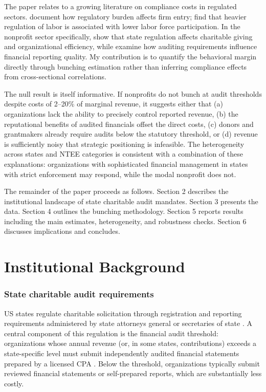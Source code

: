 \documentclass[12pt]{article}
\begin{document}
The paper relates to a growing literature on compliance costs in regulated sectors. \citet{Djankov2002} document how regulatory burden affects firm entry; \citet{Botero2004} find that heavier regulation of labor is associated with lower labor force participation. In the nonprofit sector specifically, \citet{Garven2018} show that state regulation affects charitable giving and organizational efficiency, while \citet{Krishnan2006} examine how auditing requirements influence financial reporting quality. My contribution is to quantify the behavioral margin directly through bunching estimation rather than inferring compliance effects from cross-sectional correlations.

The null result is itself informative. If nonprofits do not bunch at audit thresholds despite costs of 2--20\% of marginal revenue, it suggests either that (a) organizations lack the ability to precisely control reported revenue, (b) the reputational benefits of audited financials offset the direct costs, (c) donors and grantmakers already require audits below the statutory threshold, or (d) revenue is sufficiently noisy that strategic positioning is infeasible. The heterogeneity across states and NTEE categories is consistent with a combination of these explanations: organizations with sophisticated financial management in states with strict enforcement may respond, while the modal nonprofit does not.

The remainder of the paper proceeds as follows. Section 2 describes the institutional landscape of state charitable audit mandates. Section 3 presents the data. Section 4 outlines the bunching methodology. Section 5 reports results including the main estimates, heterogeneity, and robustness checks. Section 6 discusses implications and concludes.

\section{Institutional Background}

\subsubsection*{State charitable audit requirements} US states regulate charitable solicitation through registration and reporting requirements administered by state attorneys general or secretaries of state \citep{Fishman2015}. A central component of this regulation is the financial audit threshold: organizations whose annual revenue (or, in some states, contributions) exceeds a state-specific level must submit independently audited financial statements prepared by a licensed CPA \citep{NASCO2020}. Below the threshold, organizations typically submit reviewed financial statements or self-prepared reports, which are substantially less costly.
\end{document}
